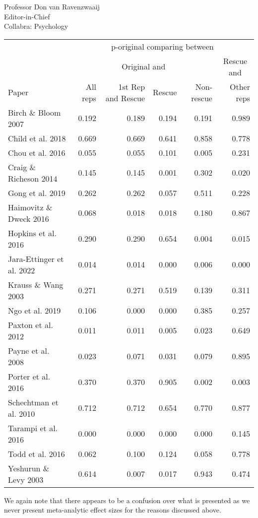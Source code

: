 \documentclass{stanfordletter}
\begin{document}
\begin{letter}{Professor Don van Ravenzwaaij \\ Editor-in-Chief \\ Collabra: Psychology }
			\begin{tabular}[t]{lrrrrr}
				\toprule
				\multicolumn{1}{c}{ } & \multicolumn{5}{c}{p-original comparing between} \\
				\cmidrule(l{3pt}r{3pt}){2-6}
				\multicolumn{1}{c}{ } & \multicolumn{4}{c}{Original and} & \multicolumn{1}{c}{Rescue and} \\
				\cmidrule(l{3pt}r{3pt}){2-5} \cmidrule(l{3pt}r{3pt}){6-6}
				Paper & All reps & 1st Rep and Rescue & Rescue & Non-rescue & Other reps\\
				\midrule
				Birch \& Bloom 2007 & 0.192 & 0.189 & 0.194 & 0.191 & 0.989\\
				Child et al. 2018 & 0.669 & 0.669 & 0.641 & 0.858 & 0.778\\
				Chou et al. 2016 & 0.055 & 0.055 & 0.101 & 0.005 & 0.231\\
				Craig \& Richeson 2014 & 0.145 & 0.145 & 0.001 & 0.302 & 0.020\\
				Gong et al. 2019 & 0.262 & 0.262 & 0.057 & 0.511 & 0.228\\
				Haimovitz \& Dweck 2016 & 0.068 & 0.018 & 0.018 & 0.180 & 0.867\\
				Hopkins et al. 2016 & 0.290 & 0.290 & 0.654 & 0.004 & 0.015\\
				Jara-Ettinger et al. 2022 & 0.014 & 0.014 & 0.000 & 0.006 & 0.000\\
				Krauss \& Wang 2003 & 0.271 & 0.271 & 0.519 & 0.139 & 0.311\\
				Ngo et al. 2019 & 0.106 & 0.000 & 0.000 & 0.385 & 0.257\\
				Paxton et al. 2012 & 0.011 & 0.011 & 0.005 & 0.023 & 0.649\\
				Payne et al. 2008 & 0.023 & 0.071 & 0.031 & 0.079 & 0.895\\
				Porter et al. 2016 & 0.370 & 0.370 & 0.905 & 0.002 & 0.003\\
				Schechtman et al. 2010 & 0.712 & 0.712 & 0.654 & 0.770 & 0.877\\
				Tarampi et al. 2016 & 0.000 & 0.000 & 0.000 & 0.000 & 0.145\\
				Todd et al. 2016 & 0.062 & 0.100 & 0.124 & 0.058 & 0.778\\
				Yeshurun \& Levy 2003 & 0.614 & 0.007 & 0.017 & 0.943 & 0.474\\
				\bottomrule
			\end{tabular}
		
		We again note that there appears to be a confusion over what is presented as we never present meta-analytic effect sizes for the reasons discussed above. 
		

\end{letter}
\end{document}
